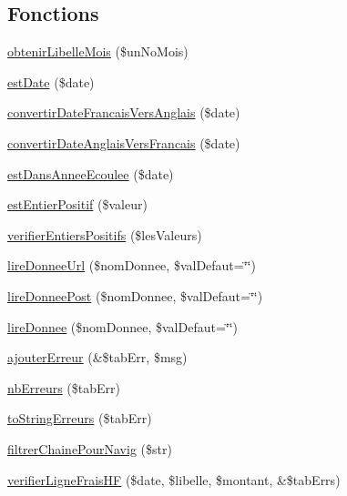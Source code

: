 \subsection*{Fonctions}
\begin{DoxyCompactItemize}
\item 
\hyperlink{__utilitaires_et_gestion_erreurs_8lib_8php_a991bef919e2c370187e9d7eec29f8f50}{obtenir\-Libelle\-Mois} (\$un\-No\-Mois)
\item 
\hyperlink{__utilitaires_et_gestion_erreurs_8lib_8php_a4f7821728a7b40482111da18fc60603f}{est\-Date} (\$date)
\item 
\hyperlink{__utilitaires_et_gestion_erreurs_8lib_8php_a39cb4860d4761f8107a63bac07db4102}{convertir\-Date\-Francais\-Vers\-Anglais} (\$date)
\item 
\hyperlink{__utilitaires_et_gestion_erreurs_8lib_8php_ace9e1c93b7ce32b3ab1aa8f86e033e78}{convertir\-Date\-Anglais\-Vers\-Francais} (\$date)
\item 
\hyperlink{__utilitaires_et_gestion_erreurs_8lib_8php_a092454f070d08318790e482128089483}{est\-Dans\-Annee\-Ecoulee} (\$date)
\item 
\hyperlink{__utilitaires_et_gestion_erreurs_8lib_8php_a5891ac42bd25b5bb5a9427174f8eb15f}{est\-Entier\-Positif} (\$valeur)
\item 
\hyperlink{__utilitaires_et_gestion_erreurs_8lib_8php_a3457b44782886f81a118ee6ae62f9568}{verifier\-Entiers\-Positifs} (\$les\-Valeurs)
\item 
\hyperlink{__utilitaires_et_gestion_erreurs_8lib_8php_ad3618b973b51810a2eb97a0493ade9ee}{lire\-Donnee\-Url} (\$nom\-Donnee, \$val\-Defaut=\char`\"{}\char`\"{})
\item 
\hyperlink{__utilitaires_et_gestion_erreurs_8lib_8php_ab0070fc1ef4283caa3457dd5b71a86de}{lire\-Donnee\-Post} (\$nom\-Donnee, \$val\-Defaut=\char`\"{}\char`\"{})
\item 
\hyperlink{__utilitaires_et_gestion_erreurs_8lib_8php_ab4e61487d300e37e058c1fd31c0446a9}{lire\-Donnee} (\$nom\-Donnee, \$val\-Defaut=\char`\"{}\char`\"{})
\item 
\hyperlink{__utilitaires_et_gestion_erreurs_8lib_8php_a6958994232c9af063f867d133a044ab5}{ajouter\-Erreur} (\&\$tab\-Err, \$msg)
\item 
\hyperlink{__utilitaires_et_gestion_erreurs_8lib_8php_a61c228522012792b81b2931ef1ae32ce}{nb\-Erreurs} (\$tab\-Err)
\item 
\hyperlink{__utilitaires_et_gestion_erreurs_8lib_8php_a2ff214e84108237a421875ab1ab3f7fa}{to\-String\-Erreurs} (\$tab\-Err)
\item 
\hyperlink{__utilitaires_et_gestion_erreurs_8lib_8php_ad19609774a0abdc797f46e59df5aa55f}{filtrer\-Chaine\-Pour\-Navig} (\$str)
\item 
\hyperlink{__utilitaires_et_gestion_erreurs_8lib_8php_add1850973a586302c7fab9e20bd1dd25}{verifier\-Ligne\-Frais\-H\-F} (\$date, \$libelle, \$montant, \&\$tab\-Errs)
\end{DoxyCompactItemize}


